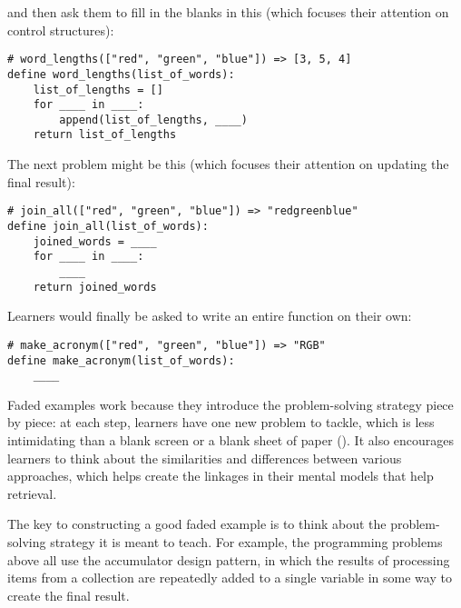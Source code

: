 \noindent
and then ask them to fill in the blanks in this
(which focuses their attention on control structures):

\begin{verbatim}
# word_lengths(["red", "green", "blue"]) => [3, 5, 4]
define word_lengths(list_of_words):
    list_of_lengths = []
    for ____ in ____:
        append(list_of_lengths, ____)
    return list_of_lengths
\end{verbatim}

The next problem might be this
(which focuses their attention on updating the final result):

\begin{verbatim}
# join_all(["red", "green", "blue"]) => "redgreenblue"
define join_all(list_of_words):
    joined_words = ____
    for ____ in ____:
        ____
    return joined_words
\end{verbatim}

Learners would finally be asked to write an entire function on their own:

\begin{verbatim}
# make_acronym(["red", "green", "blue"]) => "RGB"
define make_acronym(list_of_words):
    ____
\end{verbatim}

Faded examples work because
they introduce the problem-solving strategy piece by piece:
at each step,
learners have one new problem to tackle,
which is less intimidating than a blank screen or a blank sheet of paper ().
It also encourages learners to think about the similarities and differences between various approaches,
which helps create the linkages in their mental models that help retrieval.

The key to constructing a good faded example is
to think about the problem-solving strategy it is meant to teach.
For example,
the programming problems above all use the accumulator design pattern,
in which the results of processing items from a collection
are repeatedly added to a single variable in some way to create the final result.

